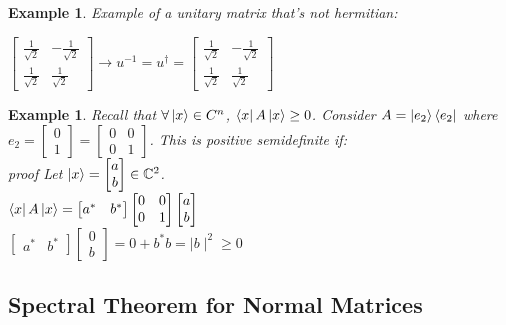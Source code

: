 \documentclass[12pt]{article}
\theoremstyle{plain}
\theoremstyle{nonumberplain}
\theoremstyle{plain}
\newtheorem{example}[lemma]{Example}
\theoremstyle{nonumberplain}
\newcommand\1{{\bf 1}}
\newcommand{\bmat}[1]{\begin{bmatrix*} #1 \end{bmatrix*}} %
\newcommand{\C}{\mathbb{C}} %
\newcommand{\<}{\left\langle}
\renewcommand{\>}{\right\rangle}
\begin{document}
\begin{example}
Example of a unitary matrix that's not hermitian: 
\begin{center}
$\bmat{\frac{1}{\sqrt{2}} & -\frac{1}{\sqrt{2}} \\ \frac{1}{\sqrt{2}} & \frac{1}{\sqrt{2}}}\longrightarrow u^{-1}=u^\dagger=\bmat{\frac{1}{\sqrt{2}} & -\frac{1}{\sqrt{2}} \\ \frac{1}{\sqrt{2}} & \frac{1}{\sqrt{2}}}$
\end{center}
\end{example}
\begin{example}
Recall that $\forall\ket{x}\in{C^n}$, $\bra{x}A\ket{x}\geq 0$. Consider $A=\ket{e_2}\bra{e_2}$ where $e_2=\bmat{0 \\ 1}=\bmat{0 & 0 \\ 0 & 1}$. This is positive semidefinite if: \\
\textit{proof} Let $\ket{x}=\bmat{a \\ b}\in\C^2$. \\
$\bra{x}A\ket{x}=\bmat{a^* & b^*}\bmat{0 & 0 \\ 0 & 1}\bmat{a \\ b}$ \\
$\bmat{a^* & b^*}\bmat{0 \\ b}=0+b^*b=\mid b\mid^2\geq0$
\end{example}


\subsection{Spectral Theorem for Normal Matrices}
\end{document}
